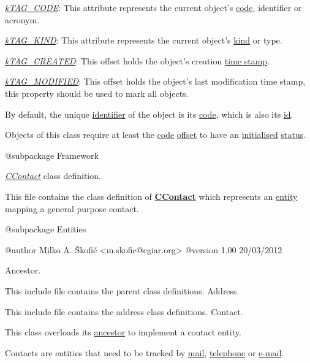 \begin{DoxyItemize}
\item {\itshape \hyperlink{}{k\-T\-A\-G\-\_\-\-C\-O\-D\-E}}\-: This attribute represents the current object's \hyperlink{}{code}, identifier or acronym. 
\item {\itshape \hyperlink{}{k\-T\-A\-G\-\_\-\-K\-I\-N\-D}}\-: This attribute represents the current object's \hyperlink{}{kind} or type. 
\item {\itshape \hyperlink{}{k\-T\-A\-G\-\_\-\-C\-R\-E\-A\-T\-E\-D}}\-: This offset holds the object's creation \hyperlink{}{time stamp}. 
\item {\itshape \hyperlink{}{k\-T\-A\-G\-\_\-\-M\-O\-D\-I\-F\-I\-E\-D}}\-: This offset holds the object's last modification time stamp, this property should be used to mark all objects. 
\end{DoxyItemize}

By default, the unique \hyperlink{}{identifier} of the object is its \hyperlink{}{code}, which is also its \hyperlink{}{id}.

Objects of this class require at least the \hyperlink{}{code} \hyperlink{}{offset} to have an \hyperlink{}{initialised} \hyperlink{}{status}.

\begin{DoxyVerb}    @subpackage     Framework\end{DoxyVerb}


{\itshape \hyperlink{class_c_contact}{C\-Contact}} class definition.

This file contains the class definition of {\bfseries \hyperlink{class_c_contact}{C\-Contact}} which represents an \hyperlink{class_c_entity}{entity} mapping a general purpose contact.

\begin{DoxyVerb}    @subpackage     Entities

    @author         Milko A. Škofič <m.skofic@cgiar.org>
    @version        1.00 20/03/2012\end{DoxyVerb}


Ancestor.

This include file contains the parent class definitions. Address.

This include file contains the address class definitions. Contact.

This class overloads its \hyperlink{class_c_entity}{ancestor} to implement a contact entity.

Contacts are entities that need to be tracked by \hyperlink{}{mail}, \hyperlink{}{telephone} or \hyperlink{}{e-\/mail}.

